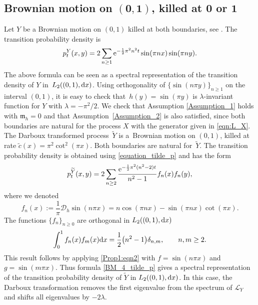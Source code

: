 \documentclass[10pt,a4paper]{amsart}
\numberwithin{equation}{section}
\theoremstyle{definition}
\def\L{{\mathcal L}}
\def\d{{\textnormal d}}
\begin{document}
\subsection[Brownian motion on (0,1), killed at 0 or 1]{Brownian motion on $\boldsymbol{(0,1)}$, killed at $\boldsymbol{0}$ or $\boldsymbol{1}$}\label{example4}


Let $Y$ be a Brownian motion on $(0,1)$ killed at both boundaries, see \cite[p.\ 122]{Borodin2002}. The transition probability density is
\[
p^Y_t(x,y)=2\sum\limits_{n\ge 1} {\rm e}^{-\frac{1}{2} \pi^2 n^2 t}
\sin(\pi n x) \sin(\pi n y).
\]
The above formula can be seen as a spectral representation of the transition density of $Y$ in~$L_2((0,1),\d x)$. Using orthogonality of $\{\sin(n \pi y)\}_{n\ge 1}$ on the interval $(0,1)$, it is easy to check that~${h(y)=\sin(\pi y)}$ is $\lambda$-invariant function for $Y$ with $\lambda=-\pi^2/2$. We check that Assumption \ref{Assumption_1} holds with ${\mathfrak m}_h=0$ and that Assumption~\ref{Assumption_2} is also satisfied, since both boundaries are natural for the process $X$ with the generator given in \eqref{eqn:L_X}. The Darboux transformed process~$\widetilde Y$ is a~Brownian motion on $(0,1)$, killed at rate
$\tilde c(x)= \pi^2 \cot^{2} (\pi x)$. Both boundaries are natural for~$\widetilde Y$. The transition probability density is obtained using \eqref{equation_tilde_p} and has the form
\begin{equation}\label{BM_4_tilde_p}
p^{\widetilde Y}_t(x,y)=2\sum\limits_{n\ge 2} \frac{{\rm e}^{-\frac{1}{2} \pi^2 ( n^2-2) t} }{n^2-1} f_n(x) f_n(y),
\end{equation}
where we denoted
\[
f_n(x):=\frac{1}{\pi} {\mathcal D}_h \sin(n \pi x)=n \cos(\pi n x)- \sin(\pi n x) \cot(\pi x).
\]
The functions $\{f_n\}_{n\ge 0}$ are orthogonal in $L_2((0,1),\d x)$
\[
\int_0^1 f_n(x) f_m(x) \d x=\frac{1}{2} \bigl(n^2-1\bigr) \delta_{n,m}, \qquad n,m\ge 2.
\]
This result follows by applying \eqref{Prop1:eqn2} with $f=\sin(n \pi x)$ and $g=\sin(m \pi x)$. Thus formula \eqref{BM_4_tilde_p} gives a spectral representation of the transition probability density of $\widetilde Y$ in $L_2((0,1),\d x)$. In this case, the Darboux transformation removes the first eigenvalue from the spectrum of $\L_Y$ and shifts all eigenvalues by $-2 \lambda$.
\end{document}
